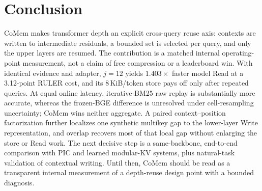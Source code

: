 \section{Conclusion}
\label{sec:conclusion}

CoMem makes transformer depth an explicit cross-query reuse axis: contexts are
written to intermediate residuals, a bounded set is selected per query, and only
the upper layers are resumed. The contribution is a matched internal
operating-point measurement, not a
claim of free compression or a leaderboard win. With identical evidence and
adapter, $j{=}12$ yields $1.403\times$ faster model Read at a 3.12-point RULER
cost, and its 8\,KiB/token store pays off only after repeated queries. At equal
online latency, iterative-BM25 raw replay is substantially more accurate,
whereas the frozen-BGE difference is unresolved under cell-resampling
uncertainty; CoMem wins neither aggregate.
A paired
context--position factorization further localizes one synthetic multikey gap to
the lower-layer Write representation, and overlap recovers most of that local
gap without enlarging the store or Read work. The next decisive step is a
same-backbone, end-to-end comparison with PIC and learned modular-KV systems,
plus natural-task validation of contextual writing. Until then, CoMem should be
read as a transparent internal measurement of a depth-reuse design point with
a bounded diagnosis.
